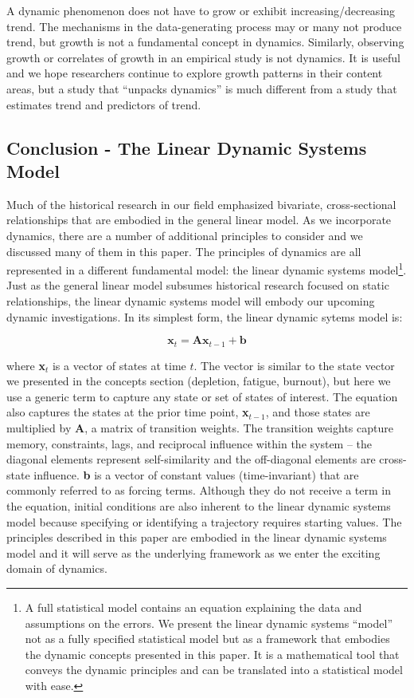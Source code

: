 \documentclass[english,,man]{apa6}
\begin{document}
A dynamic phenomenon does not have to grow or exhibit increasing/decreasing trend. The mechanisms in the data-generating process may or many not produce trend, but growth is not a fundamental concept in dynamics. Similarly, observing growth or correlates of growth in an empirical study is not dynamics. It is useful and we hope researchers continue to explore growth patterns in their content areas, but a study that \enquote{unpacks dynamics} is much different from a study that estimates trend and predictors of trend.

\hypertarget{conclusion---the-linear-dynamic-systems-model}{%
\subsection{Conclusion - The Linear Dynamic Systems Model}\label{conclusion---the-linear-dynamic-systems-model}}

Much of the historical research in our field emphasized bivariate, cross-sectional relationships that are embodied in the general linear model. As we incorporate dynamics, there are a number of additional principles to consider and we discussed many of them in this paper. The principles of dynamics are all represented in a different fundamental model: the linear dynamic systems model\footnote{A full statistical model contains an equation explaining the data and assumptions on the errors. We present the linear dynamic systems \enquote{model} not as a fully specified statistical model but as a framework that embodies the dynamic concepts presented in this paper. It is a mathematical tool that conveys the dynamic principles and can be translated into a statistical model with ease.}. Just as the general linear model subsumes historical research focused on static relationships, the linear dynamic systems model will embody our upcoming dynamic investigations. In its simplest form, the linear dynamic sytems model is:

\begin{equation}
\textbf{x}_t = \textbf{A} \textbf{x}_{t-1} + \textbf{b}
\end{equation}

\noindent where \textbf{x}\(_t\) is a vector of states at time \(t\). The vector is similar to the state vector we presented in the concepts section (depletion, fatigue, burnout), but here we use a generic term to capture any state or set of states of interest. The equation also captures the states at the prior time point, \textbf{x}\(_{t-1}\), and those states are multiplied by \textbf{A}, a matrix of transition weights. The transition weights capture memory, constraints, lags, and reciprocal influence within the system -- the diagonal elements represent self-similarity and the off-diagonal elements are cross-state influence. \textbf{b} is a vector of constant values (time-invariant) that are commonly referred to as forcing terms. Although they do not receive a term in the equation, initial conditions are also inherent to the linear dynamic systems model because specifying or identifying a trajectory requires starting values. The principles described in this paper are embodied in the linear dynamic systems model and it will serve as the underlying framework as we enter the exciting domain of dynamics.
\end{document}
